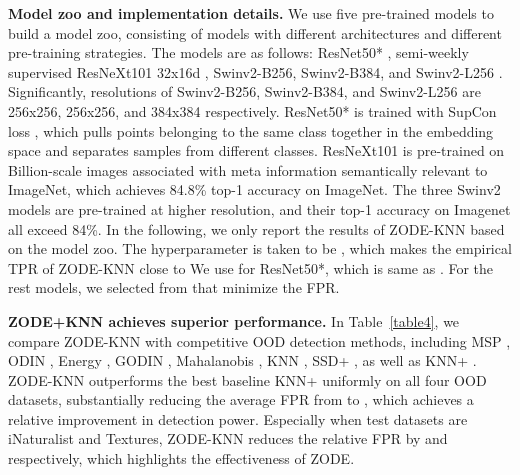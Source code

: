 \documentclass{article} \usepackage{iclr2023_conference,times}
\begin{document}
{\bf Model zoo and implementation details.} We use five pre-trained models to build a model zoo, consisting of models with different architectures and different pre-training strategies. 
The models are as follows: ResNet50* \citep{sun2022knn}, semi-weekly supervised ResNeXt101 32x16d \citep{yalniz2019billion}, Swinv2-B256, Swinv2-B384, and Swinv2-L256 \citep{liu2021swinv2}. Significantly, resolutions of Swinv2-B256, Swinv2-B384, and Swinv2-L256 are 256x256, 256x256, and 384x384 respectively. ResNet50* is trained with SupCon loss \citep{khosla2020supervised}, which pulls points belonging to the same class together in the embedding space and separates samples from different classes.
ResNeXt101 is pre-trained on Billion-scale images associated with meta information semantically relevant to ImageNet, which achieves 84.8\% top-1 accuracy on ImageNet. The three Swinv2 models are pre-trained at higher resolution, and their top-1 accuracy on Imagenet all exceed  84\%.
In the following, we only report the results of ZODE-KNN based on the model zoo.
The hyperparameter  is taken to be , which makes the empirical TPR of ZODE-KNN close to 
We use  for ResNet50*, which is same as \cite{sun2022knn}. For the rest models, we selected  from  that minimize the FPR.

{\bf ZODE+KNN achieves superior performance.} In Table~\ref{table4}, we compare ZODE-KNN with competitive OOD detection methods, including MSP \citep{hendrycks17baseline}, ODIN \citep{liang2018enhancing}, Energy \citep{liu2020energy}, GODIN \citep{hsu2020generalized}, Mahalanobis \citep{lee2018simple}, KNN \citep{sun2022knn}, SSD+ \citep{sehwag2021ssd}, as well as KNN+ \citep{sun2022knn}. 
ZODE-KNN outperforms the best baseline KNN+ uniformly on all four OOD datasets, substantially reducing the average FPR from  to , which achieves a relative  improvement in detection power. 
Especially when test datasets are iNaturalist and Textures, ZODE-KNN reduces the relative FPR by  and  respectively, which highlights the effectiveness of ZODE.
\end{document}
